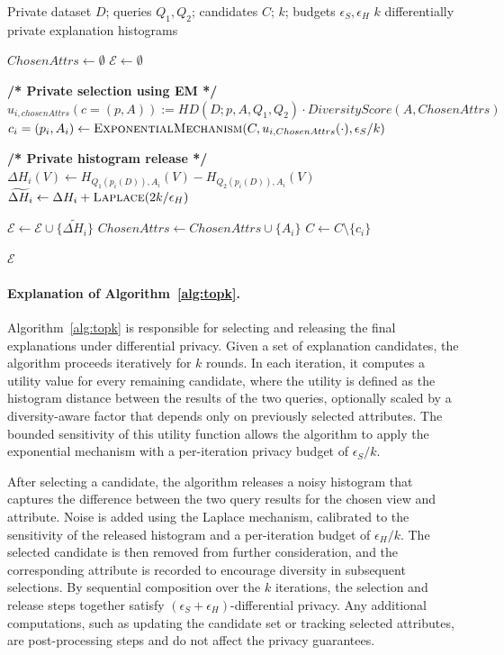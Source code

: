 \begin{algorithm}[t]
\caption{Find-Top-$k$-Explanations}
\label{alg:topk}
\begin{algorithmic}[1]
\Require Private dataset $D$; queries $Q_1,Q_2$; candidates $C$; $k$; budgets $\epsilon_S,\epsilon_H$
\Ensure $k$ differentially private explanation histograms

\State $ChosenAttrs \gets \emptyset$
\State $\mathcal{E} \gets \emptyset$


  \State \textbf{/* Private selection using EM */}
  \State $u_{i,chosenAttrs}(c=(p,A)) := HD(D; p,A,Q_1,Q_2) \cdot DiversityScore(A,ChosenAttrs)$
  \State $c_i=(p_i,A_i) \gets \textsc{ExponentialMechanism}( \newline C, u_{i, ChosenAttrs}(\cdot), \epsilon_S/k)$

  \State \textbf{/* Private histogram release */}
  \State $\Delta H_i(V) \gets H_{Q_1(p_i(D)),A_i}(V)-H_{Q_2(p_i(D)),A_i}(V)$
  \State $\widetilde{\Delta H_i} \gets \Delta H_i + \textsc{Laplace}(2k/\epsilon_H)$

  \State $\mathcal{E} \gets \mathcal{E} \cup \{\widetilde{\Delta H_i}\}$
  \State $ChosenAttrs \gets ChosenAttrs \cup \{A_i\}$
  \State $C \gets C \setminus \{c_i\}$

\EndFor


\State \Return $\mathcal{E}$
\end{algorithmic}
\end{algorithm}
\paragraph{Explanation of Algorithm~\ref{alg:topk}.}
Algorithm~\ref{alg:topk} is responsible for selecting and releasing the final explanations under differential privacy. Given a set of explanation candidates, the algorithm proceeds iteratively for $k$ rounds. In each iteration, it computes a utility value for every remaining candidate, where the utility is defined as the histogram distance between the results of the two queries, optionally scaled by a diversity-aware factor that depends only on previously selected attributes. The bounded sensitivity of this utility function allows the algorithm to apply the exponential mechanism with a per-iteration privacy budget of $\epsilon_S/k$.

After selecting a candidate, the algorithm releases a noisy histogram that captures the difference between the two query results for the chosen view and attribute. Noise is added using the Laplace mechanism, calibrated to the sensitivity of the released histogram and a per-iteration budget of $\epsilon_H/k$. The selected candidate is then removed from further consideration, and the corresponding attribute is recorded to encourage diversity in subsequent selections. By sequential composition over the $k$ iterations, the selection and release steps together satisfy $(\epsilon_S + \epsilon_H)$-differential privacy. Any additional computations, such as updating the candidate set or tracking selected attributes, are post-processing steps and do not affect the privacy guarantees.

